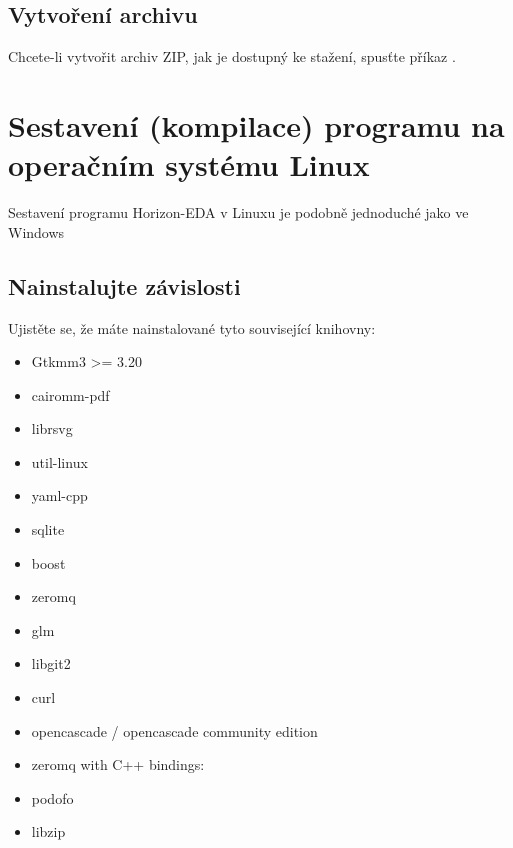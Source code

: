 \documentclass[letterpaper,10pt,czech]{sphinxmanual}
\begin{document}
\section{Vytvoření archivu}
\label{\detokenize{build-win32:vytvoreni-archivu}}
Chcete-li vytvořit archiv ZIP, jak je dostupný ke stažení, spusťte příkaz
.


\chapter{Sestavení (kompilace) programu na operačním systému Linux}
\label{\detokenize{build-linux:sestaveni-kompilace-programu-na-operacnim-systemu-linux}}\label{\detokenize{build-linux::doc}}
Sestavení programu Horizon-EDA v Linuxu je podobně jednoduché jako ve Windows


\section{Nainstalujte závislosti}
\label{\detokenize{build-linux:nainstalujte-zavislosti}}
Ujistěte se, že máte nainstalované tyto související knihovny:
\begin{itemize}
\item {} 
Gtkmm3 \textgreater{}= 3.20

\item {} 
cairomm-pdf

\item {} 
librsvg

\item {} 
util-linux

\item {} 
yaml-cpp

\item {} 
sqlite

\item {} 
boost

\item {} 
zeromq

\item {} 
glm

\item {} 
libgit2

\item {} 
curl

\item {} 
opencascade / opencascade community edition

\item {} 
zeromq with C++ bindings: 

\item {} 
podofo

\item {} 
libzip

\end{itemize}
\end{document}
